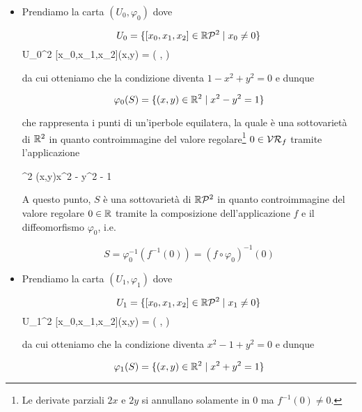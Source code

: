 \begin{itemize}
	\item Prendiamo la carta $ (U_{0},\varphi_{0}) $ dove
	
	\begin{equation}
		U_{0} = \{ [x_{0},x_{1},x_{2}] \in \mathbb{R}\mathcal{P}^{2} \mid x_{0} \neq 0 \}
	\end{equation}
		{U_{0}}{\R^{2}}
		{[x_{0},x_{1},x_{2}]}{(x,y) = \left( ,  \right)}
	
	da cui otteniamo che la condizione diventa $ 1 - x^{2} + y^{2} = 0 $ e dunque
	
	\begin{equation}
		\varphi_{0}(S) = \{ (x,y) \in \mathbb{R}^{2} \mid x^{2} - y^{2} = 1 \}
	\end{equation}

	che rappresenta i punti di un'iperbole equilatera, la quale è una sottovarietà di $ \mathbb{R}^{2} $ in quanto controimmagine del valore regolare\footnote{%
		Le derivate parziali $ 2x $ e $ 2y $ si annullano solamente in 0 ma $ f^{-1}(0) \neq 0 $.%
	} $ 0 \in \mathcal{VR}_{f} $ tramite l'applicazione
	
		{\R^{2}}{\R}
		{(x,y)}{x^{2} - y^{2} - 1}
	
	A questo punto, $ S $ è una sottovarietà di $ \mathbb{R}\mathcal{P}^{2} $ in quanto controimmagine del valore regolare $ 0 \in \mathbb{R} $ tramite la composizione dell'applicazione $ f $	e il diffeomorfismo $ \varphi_{0} $, i.e.
	
	\begin{equation}
		S = \varphi_{0}^{-1} (f^{-1}(0)) = (f \circ \varphi_{0})^{-1} (0)
	\end{equation}
	
	\item Prendiamo la carta $ (U_{1},\varphi_{1}) $ dove
	
	\begin{equation}
		U_{1} = \{ [x_{0},x_{1},x_{2}] \in \mathbb{R}\mathcal{P}^{2} \mid x_{1} \neq 0 \}
	\end{equation}
		{U_{1}}{\R^{2}}
		{[x_{0},x_{1},x_{2}]}{(x,y) = \left( ,  \right)}
	
	da cui otteniamo che la condizione diventa $ x^{2} - 1 + y^{2} = 0 $ e dunque
	
	\begin{equation}
		\varphi_{1}(S) = \{ (x,y) \in \mathbb{R}^{2} \mid x^{2} + y^{2} = 1 \}
	\end{equation}
	

\end{itemize}
